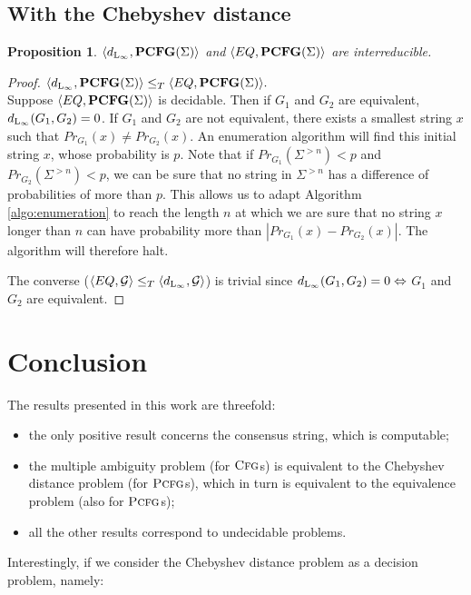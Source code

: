 \documentclass[submission]{eptcs} \usepackage{breakurl}             \usepackage[english]{babel}
\newtheorem{proposition}{Proposition}
\providecommand{\Grammarclass}{\ensuremath{\mathcal{G}}}
\providecommand{\PCFGclass}{\textup{\textbf{PCFG}(\ensuremath{\Sigma})}}
\providecommand{\Linf}{\textup{L}\ensuremath{_{\infty}}}
\providecommand{\CFG}{\ensuremath{\textsc{Cfg}}}
\providecommand{\PCFG}{\ensuremath{\textsc{Pcfg}}}
\providecommand{\Prob}{\ensuremath{Pr}}
\begin{document}
\subsection{With the Chebyshev distance}
\begin{proposition}
$\langle d_{\Linf},\PCFGclass\rangle$ and $\langle EQ,\PCFGclass\rangle$ are interreducible.
\end{proposition}
\begin{proof}
$\langle d_{\Linf},\PCFGclass\rangle\le_T \langle EQ,\PCFGclass\rangle.$\\
Suppose $\langle EQ,\PCFGclass\rangle$ is decidable. Then if $G_1$ and $G_2$ are equivalent, $d_{\Linf}(G_1,G_2)=0$.
If $G_1$ and $G_2$ are not equivalent, there exists a smallest string $x$ such that $\Prob_{G_1}(x)\neq\Prob_{G_2}(x)$. An enumeration algorithm will find this initial string $x$, whose probability is $p$. Note that if $\Prob_{G_1}(\Sigma^{>n})<p$ and $\Prob_{G_2}(\Sigma^{>n})<p$, we can be sure that no string in $\Sigma^{>n}$ has a difference of probabilities of more than $p$. This allows us to adapt Algorithm \ref{algo:enumeration} to reach the length $n$ at which we are sure that no string $x$ longer than $n$ can have probability more than $|\Prob_{G_1}(x)-\Prob_{G_2}(x)|$. The algorithm will therefore halt.

The converse ($\langle EQ,\Grammarclass\rangle\le_T\langle d_{\Linf},\Grammarclass\rangle$) is trivial since $d_{\Linf}(G_1,G_2)=0\Leftrightarrow$ $G_1$ and $G_2$ are equivalent.
\end{proof}



\section{Conclusion}\label{sec:con}
The results presented in this work are threefold:
\begin{itemize}
\item the only positive result concerns the consensus string, which is computable;
\item the multiple ambiguity problem (for $\CFG$s) is equivalent to the Chebyshev distance problem (for $\PCFG$s), which in turn is equivalent to the equivalence problem (also for $\PCFG$s);
\item all the other results correspond to undecidable problems.
\end{itemize}

Interestingly, if we consider the Chebyshev distance problem as a decision problem, namely:
\end{document}
